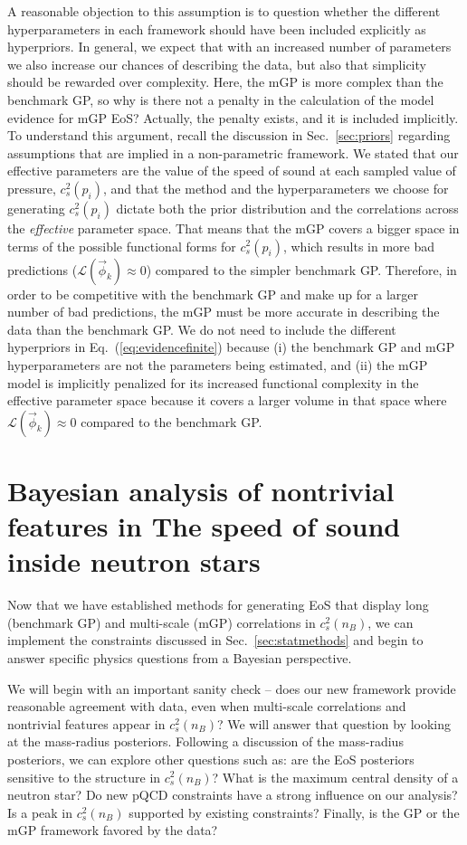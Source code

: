 \documentclass[aps,prd,nofootinbib,tightenlines,notitlepage,floatfix,superscriptaddress,showkeys,twocolumn]{revtex4-1}
\begin{document}
A reasonable objection to this assumption is to question whether the different hyperparameters in each framework should have been included explicitly as hyperpriors. In general, we expect that with an increased number of parameters we also increase our chances of describing the data, but also that simplicity should be rewarded over complexity. Here, the mGP is more complex than the benchmark GP, so why is there not a penalty in the calculation of the model evidence for mGP EoS? Actually, the penalty exists, and it is included implicitly. To understand this argument, recall the discussion in Sec.~{\ref{sec:priors}} regarding assumptions that are implied in a non-parametric framework. We stated that our effective parameters are the value of the speed of sound at each sampled value of pressure, $c_s^2(p_i)$, and that the method and the hyperparameters we choose for generating $c_s^2(p_i)$ dictate both the prior distribution and the correlations across the \emph{effective} parameter space. That means that the mGP covers a bigger space in terms of the possible functional forms for $c_s^2(p_i)$, which results in more bad predictions ($\mathcal{L}(\vec{\phi}_k) \approx 0$) compared to the simpler benchmark GP. Therefore, in order to be competitive with the benchmark GP and make up for a larger number of bad predictions, the mGP must be more accurate in describing the data than the benchmark GP. We do not need to include the different hyperpriors in Eq.~(\ref{eq:evidencefinite}) because (i) the benchmark GP and mGP hyperparameters are not the parameters being estimated, and (ii) the  mGP model is implicitly penalized for its increased functional complexity in the effective parameter space because it covers a larger volume in that space where $\mathcal{L}(\vec{\phi}_k) \approx 0$ compared to the benchmark GP. 

\section{Bayesian analysis of nontrivial features in The speed of sound inside neutron stars}\label{sec:results}

Now that we have established methods for generating EoS that display long (benchmark GP) and multi-scale (mGP) correlations in $c_s^2(n_B)$, we can implement the constraints discussed in Sec.~\ref{sec:statmethods} and begin to answer specific physics questions from a Bayesian perspective.  

We will begin with an important sanity check -- does our new framework provide reasonable agreement with data, even when multi-scale correlations and nontrivial features appear in $c_s^2(n_B)$? We will answer that question by looking at the mass-radius posteriors. Following a discussion of the mass-radius posteriors, we can explore other questions such as: are the EoS posteriors sensitive to the structure in $c_s^2(n_B)$? What is the maximum central density of a neutron star? Do new pQCD constraints have a strong influence on our analysis? Is a peak in $c_s^2(n_B)$ supported by existing constraints? Finally, is the GP or the mGP framework favored by the data?  
\end{document}
